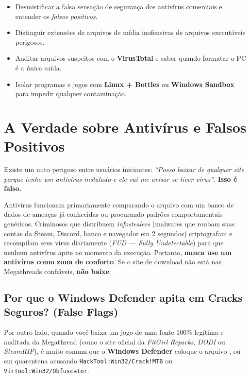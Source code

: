 \documentclass{pousadaguide}
\begin{document}
\begin{missao}
\begin{itemize}
  \item Desmistificar a falsa sensação de segurança dos antivírus comerciais e entender os \emph{falsos positivos}.
  \item Distinguir extensões de arquivos de mídia inofensivas de arquivos executáveis perigosos.
  \item Auditar arquivos suspeitos com o \textbf{VirusTotal} e saber quando formatar o PC é a única saída.
  \item Isolar programas e jogos com \textbf{Linux + Bottles} ou \textbf{Windows Sandbox} para impedir qualquer contaminação.
\end{itemize}
\end{missao}

\section{A Verdade sobre Antivírus e Falsos Positivos}

Existe um mito perigoso entre usuários iniciantes: \emph{``Posso baixar de qualquer site porque tenho um antivírus instalado e ele vai me avisar se tiver vírus''}. \textbf{Isso é falso.}

Antivírus funcionam primariamente comparando o arquivo com um banco de dados de ameaças já conhecidas ou procurando padrões comportamentais genéricos. Criminosos que distribuem \emph{infostealers} (malwares que roubam suas contas da Steam, Discord, banco e navegador em 2 segundos) criptografam e recompilam seus vírus diariamente (\emph{FUD — Fully Undetectable}) para que nenhum antivírus apite no momento da execução. Portanto, \textbf{nunca use um antivírus como zona de conforto}. Se o site de download não está nas Megathreads confiáveis, \textbf{não baixe}.

\subsection{Por que o Windows Defender apita em Cracks Seguros? (False Flags)}

Por outro lado, quando você baixa um jogo de uma fonte 100\% legítima e auditada da Megathread (como o site oficial da \emph{FitGirl Repacks}, \emph{DODI} ou \emph{SteamRIP}), é muito comum que o \textbf{Windows Defender} coloque o arquivo ,  ou  em quarentena acusando \texttt{HackTool:Win32/Crack!MTB} ou \texttt{VirTool:Win32/Obfuscator}.
\end{document}
